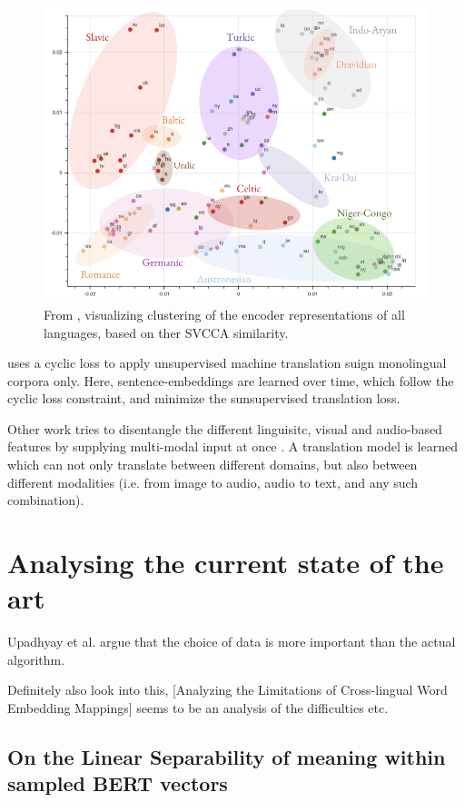 \documentclass[a4paper,12pt,twoside,openright]{report}
\begin{document}
\begin{figure}[h]
	\center
  \includegraphics[width=0.6\linewidth]{./assets/relatedwork/embeddings_by_language.png}
  \caption{From \cite{kudugunta18}, visualizing clustering of the encoder representations of all languages, based on ther SVCCA similarity.}
  \label{fig:embeddings_by_language}
\end{figure}



\cite{lample18} uses a cyclic loss to apply unsupervised machine translation suign monolingual corpora only. 
Here, sentence-embeddings are learned over time, which follow the cyclic loss constraint, and minimize the sunsupervised translation loss.

Other work tries to disentangle the different linguisitc, visual and audio-based features by supplying multi-modal input at once \cite{ma19}.
A translation model is learned which can not only translate between different domains, but also between different modalities (i.e. from image to audio, audio to text, and any such combination).



\chapter{Analysing the current state of the art}

Upadhyay et al. argue that the choice of data is more important than the actual algorithm.

Definitely also look into this, [Analyzing the Limitations of Cross-lingual Word Embedding Mappings] seems to be an analysis of the difficulties etc. 

\section{On the Linear Separability of meaning within sampled BERT vectors}
\end{document}
